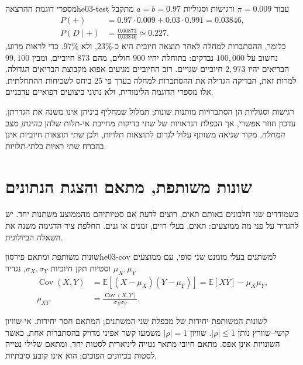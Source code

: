\begin{example}{מספרי דוגמת ההרצאה}{he03-test}
עבור $\pi=0.009$ ורגישות וסגוליות $a=b=0.97$ מתקבל
\begin{align}
P(+)&=0.97\cdot0.009+0.03\cdot0.991=0.03846,\label{eq:he03-test-total}\\
P(D\mid+)&=\frac{0.00873}{0.03846}\simeq0.227.\label{eq:he03-test-posterior}
\end{align}
כלומר, ההסתברות למחלה לאחר תוצאה חיובית היא כ-$23\%$, ולא $97\%$. כדי לראות מדוע, נחשוב על $100{,}000$ נבדקים: בתוחלת יהיו $900$ חולים, מהם $873$ חיוביים, ומבין $99{,}100$ הבריאים יהיו $2{,}973$ חיוביים שגויים. רוב החיוביים מגיעים אפוא מקבוצת הבריאים הגדולה. למרות זאת, הבדיקה הגדילה את ההסתברות למחלה בערך פי $25$ ביחס לשכיחות ההתחלתית. אלו מספרי הדוגמה הלימודית, ולא נתוני ביצועים רפואיים עדכניים.
\end{example}

\begin{remark}
רגישות וסגוליות הן הסתברויות מותנות שונות; תמלול שמחליף ביניהן אינו משנה את הגדרתן. עדכון חוזר אפשרי, אך הכפלת הנראויות של שתי בדיקות מחייבת אי-תלות שלהן \emph{בהינתן מצב המחלה}. מקור שגיאה משותף עלול לגרום לתוצאות תלויות, ולכן שתי תוצאות חיוביות אינן בהכרח שתי ראיות בלתי-תלויות.
\end{remark}

\section{שונות משותפת, מתאם והצגת הנתונים}\label{sec:he03-correlation}
כשמודדים שני חלבונים באותם תאים, רוצים לדעת אם סטיותיהם מהממוצע משתנות יחד. יש להגדיר על פני מה ממוצעים: תאים, בעלי חיים, זמנים או גנים. החלפת ציר הדגימה משנה את השאלה הביולוגית.

\begin{definition}{שונות משותפת ומתאם פירסון}{he03-cov}
למשתנים בעלי מומנט שני סופי, עם ממוצעים $\mu_X,\mu_Y$ וסטיות תקן חיוביות $\sigma_X,\sigma_Y$, נגדיר
\begin{align}
\operatorname{Cov}(X,Y)&=\mathbb{E}[(X-\mu_X)(Y-\mu_Y)]
=\mathbb{E}[XY]-\mu_X\mu_Y,\label{eq:he03-cov}\\
\rho_{XY}&=\frac{\operatorname{Cov}(X,Y)}{\sigma_X\sigma_Y}.\label{eq:he03-rho}
\end{align}
\end{definition}
לשונות המשותפת יחידות של מכפלת שני המשתנים; המתאם חסר יחידות. אי-שוויון קושי--שוורץ נותן $|\rho|\le1$. שוויון $|\rho|=1$ משמעו קשר אפיני מדויק בהסתברות אחת, כאשר השונויות אינן אפס. מתאם חיובי מתאר נטייה ליניארית לסטות יחד, ומתאם שלילי נטייה לסטות בכיוונים הפוכים; הוא אינו קובע סיבתיות.

